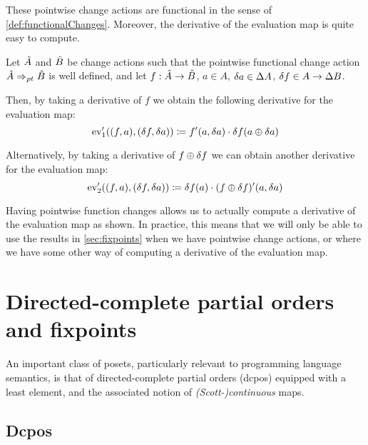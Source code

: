 These pointwise change actions are functional in the sense of \cref{def:functionalChanges}. Moreover, the derivative of the evaluation map is quite easy to 
compute.
\begin{prop}
\label{prop:evDerivatives}
  Let $\hat{A}$ and $\hat{B}$ be change actions such that the pointwise functional change action
  $\hat{A} \Rightarrow_{pt} \hat{B}$ is well defined, and let
  $f: \hat{A} \rightarrow \hat{B}$,
  $a \in A$, $\delta a \in \Delta A$,
  $\delta f \in A \rightarrow \Delta B$.

  Then, by taking a derivative of $f$ we obtain the following derivative for the evaluation map:
  \begin{displaymath}
    \operatorname{ev}'_1((f, a), (\delta f, \delta a)) 
    \coloneqq f'(a, \delta a) \cdot \delta f(a \oplus \delta a)
  \end{displaymath}

  Alternatively, by taking a derivative of $f \oplus \delta f$ we can obtain another derivative
  for the evaluation map:
  \begin{displaymath}
    \operatorname{ev}'_2((f, a), (\delta f, \delta a)) 
    \coloneqq \delta f(a) \cdot (f \oplus \delta f)'(a, \delta a)
  \end{displaymath}
\end{prop}

Having pointwise function changes allows us to actually compute a derivative of the
evaluation map as shown. In practice, this means
that we will only be able to use the results in \cref{sec:fixpoints} when
we have pointwise change actions, or where we have some other way of computing
a derivative of the evaluation map.

\section{Directed-complete partial orders and fixpoints}


An important class of posets, particularly relevant to programming language semantics, is that of 
directed-complete partial orders (dcpos) equipped with a least element, and the associated notion of \emph{(Scott-)continuous} maps. 

\subsection{Dcpos}
\label{sec:dcpos}

